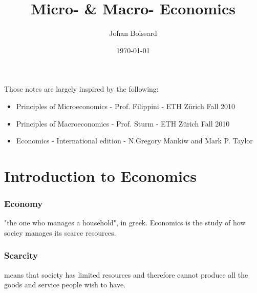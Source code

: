 \documentclass[a4paper,titlepage] {scrartcl}
\author{Johan Boissard}
\date{\today}
\title{Micro- \& Macro- Economics}
\begin{document}
\maketitle

Those notes are largely inspired by the following:
\begin{itemize}
	\item Principles of Microeconomics - Prof. Filippini - ETH Zürich Fall 2010
	\item Principles of Macroeconomics - Prof. Sturm - ETH Zürich Fall 2010
	\item Economics - International edition - N.Gregory Mankiw and Mark P. Taylor
\end{itemize}

\section{Introduction to Economics}
\subsubsection{Economy} "the one who manages a household", in greek. Economics is the study of how sociey manages its scarce resources.

\subsubsection{Scarcity}
means that society has limited resources and therefore cannot produce all the goods and service people wish to have.
\end{document}
